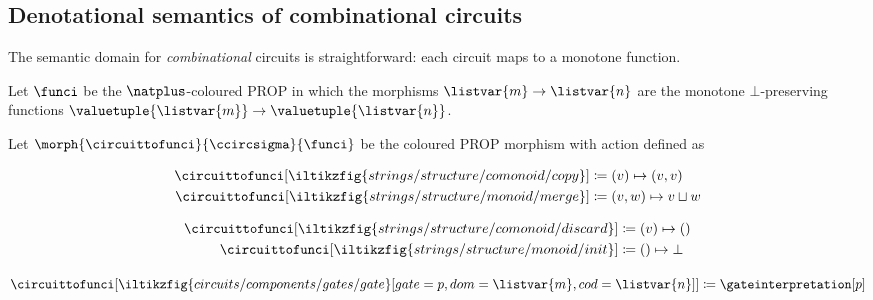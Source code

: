 \subsection{Denotational semantics of combinational circuits}

The semantic domain for \emph{combinational} circuits is straightforward: each
circuit maps to a monotone function.

\begin{definition}
    Let \(\funci\) be the \(\natplus\)-coloured PROP in which the morphisms
    \(\listvar{m} \to \listvar{n}\) are the monotone \(\bot\)-preserving
    functions \(\valuetuple{\listvar{m}} \to \valuetuple{\listvar{n}}\).
\end{definition}

\begin{definition}
    Let \(\morph{\circuittofunci}{\ccircsigma}{\funci}\) be the coloured PROP
    morphism with action defined as%
    \vspace{-\abovedisplayskip}
    \begin{center}
        \begin{minipage}{0.32\textwidth}
            \centering
            \begin{align*}
                \circuittofunci[
                    \iltikzfig{strings/structure/comonoid/copy}
                ]
                &\coloneqq
                (v) \mapsto (v, v)
                \\
                \circuittofunci[
                    \iltikzfig{strings/structure/monoid/merge}
                ]
                &\coloneqq
                (v, w) \mapsto v \sqcup w
            \end{align*}
        \end{minipage}
        \quad
        \begin{minipage}{0.25\textwidth}
            \centering
            \begin{align*}
                \circuittofunci[
                    \iltikzfig{strings/structure/comonoid/discard}
                ]
                &\coloneqq
                (v) \mapsto ()
                \\
                \circuittofunci[
                    \iltikzfig{strings/structure/monoid/init}
                ]
                &\coloneqq
                () \mapsto \bot
            \end{align*}
        \end{minipage}
        \quad
        \begin{minipage}{0.25\textwidth}
            \centering
            \vspace{1.5em}
            \(\circuittofunci[
                \iltikzfig{circuits/components/gates/gate}[gate=p,dom=\listvar{m},cod=\listvar{n}]
            ]
            \coloneqq
            \gateinterpretation[p]
            \)
        \end{minipage}
    \end{center}
\end{definition}

